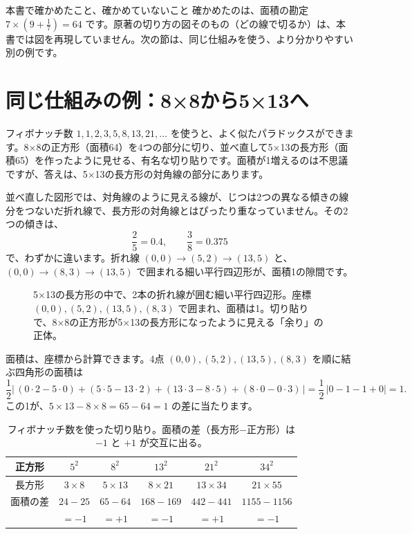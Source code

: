 \documentclass[a4paper,11pt,openany]{ltjsbook}
\begin{document}
\begin{notebox}{本書で確かめたこと、確かめていないこと}
確かめたのは、面積の勘定 $7\times(9+\tfrac17)=64$ です。原著の切り方の図そのもの（どの線で切るか）は、本書では図を再現していません。次の節は、同じ仕組みを使う、より分かりやすい別の例です。
\end{notebox}

\section{同じ仕組みの例：8×8から5×13へ}

フィボナッチ数 $1,1,2,3,5,8,13,21,\ldots$ を使うと、よく似たパラドックスができます。8×8の正方形（面積64）を4つの部分に切り、並べ直して5×13の長方形（面積65）を作ったように見せる、有名な切り貼りです。面積が1増えるのは不思議ですが、答えは、5×13の長方形の対角線の部分にあります。

並べ直した図形では、対角線のように見える線が、じつは2つの異なる傾きの線分をつないだ折れ線で、長方形の対角線とはぴったり重なっていません。その2つの傾きは、
\[
\frac25=0.4,\qquad \frac38=0.375
\]
で、わずかに違います。折れ線 $(0,0)\to(5,2)\to(13,5)$ と、$(0,0)\to(8,3)\to(13,5)$ で囲まれる細い平行四辺形が、面積1の隙間です。

\begin{figure}[htbp]
\centering
{}
\caption{5×13の長方形の中で、2本の折れ線が囲む細い平行四辺形。座標 $(0,0),(5,2),(13,5),(8,3)$ で囲まれ、面積は1。切り貼りで、8×8の正方形が5×13の長方形になったように見える「余り」の正体。}
\end{figure}

面積は、座標から計算できます。4点 $(0,0),(5,2),(13,5),(8,3)$ を順に結ぶ四角形の面積は
\[
\frac12\bigl|\,(0\cdot2-5\cdot0)+(5\cdot5-13\cdot2)+(13\cdot3-8\cdot5)+(8\cdot0-0\cdot3)\,\bigr|=\frac12\,|0-1-1+0|=1 .
\]
この1が、$5\times13-8\times8=65-64=1$ の差に当たります。

\begin{table}[htbp]
\centering
\small
\begin{tabular}{c|ccccc}
\toprule
正方形 & $5^2$ & $8^2$ & $13^2$ & $21^2$ & $34^2$\\
\midrule
長方形 & $3\times8$ & $5\times13$ & $8\times21$ & $13\times34$ & $21\times55$\\
面積の差 & $24-25$ & $65-64$ & $168-169$ & $442-441$ & $1155-1156$\\
 & $=-1$ & $=+1$ & $=-1$ & $=+1$ & $=-1$\\
\bottomrule
\end{tabular}
\caption{フィボナッチ数を使った切り貼り。面積の差（長方形$-$正方形）は $-1$ と $+1$ が交互に出る。}
\end{table}
\end{document}
